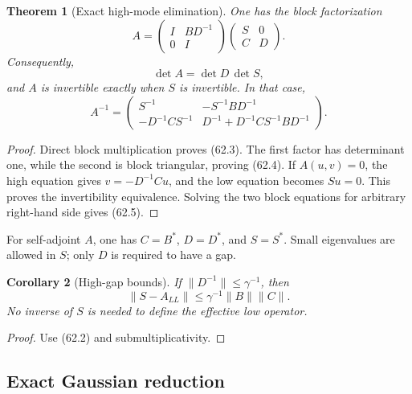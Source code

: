\documentclass[11pt]{article}
\newtheorem{theorem}{Theorem}[section]
\newtheorem{corollary}[theorem]{Corollary}
\begin{document}
\begin{theorem}[Exact high-mode elimination]
\label{thm:v11v62-schur}
One has the block factorization
\[
 A=
 \begin{pmatrix}I&BD^{-1}\\0&I\end{pmatrix}
 \begin{pmatrix}S&0\\C&D\end{pmatrix}.                        \tag{62.3}
\]
Consequently,
\[
                              \det A=\det D\,\det S,           \tag{62.4}
\]
and \(A\) is invertible exactly when \(S\) is invertible.  In that
case,
\[
 A^{-1}=
 \begin{pmatrix}
 S^{-1}&-S^{-1}BD^{-1}\\
 -D^{-1}CS^{-1}&
 D^{-1}+D^{-1}CS^{-1}BD^{-1}
 \end{pmatrix}.                                               \tag{62.5}
\]
\end{theorem}

\begin{proof}
Direct block multiplication proves (62.3).  The first factor has
determinant one, while the second is block triangular, proving
(62.4).  If \(A(u,v)=0\), the high equation gives
\(v=-D^{-1}Cu\), and the low equation becomes \(Su=0\).
This proves the invertibility equivalence.  Solving the two block
equations for arbitrary right-hand side gives (62.5).
\end{proof}

For self-adjoint \(A\), one has \(C=B^*\), \(D=D^*\), and
\(S=S^*\).  Small eigenvalues are allowed in \(S\); only \(D\) is
required to have a gap.

\begin{corollary}[High-gap bounds]
\label{cor:v11v62-gap}
If \(\lVert D^{-1}\rVert\le\gamma^{-1}\), then
\[
                  \lVert S-A_{LL}\rVert
                       \le\gamma^{-1}\lVert B\rVert\lVert C\rVert.
                                                                  \tag{62.6}
\]
No inverse of \(S\) is needed to define the effective low operator.
\end{corollary}

\begin{proof}
Use (62.2) and submultiplicativity.
\end{proof}

\subsection{Exact Gaussian reduction}
\end{document}
